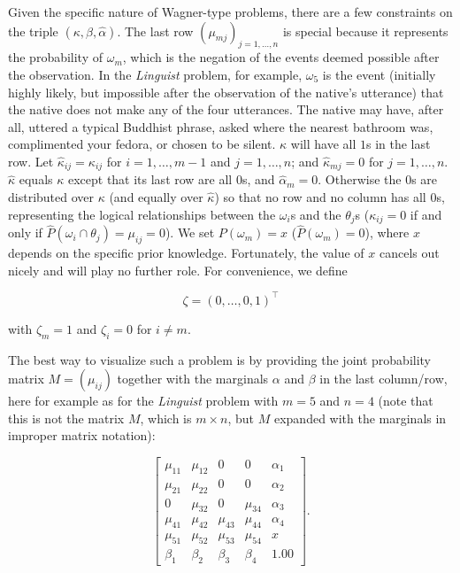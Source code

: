 \documentclass[phd,12pt,oneside]{ubcthesis}
\begin{document}
Given the specific nature of Wagner-type problems, there are a few
constraints on the triple $(\kappa,\beta,\hat{\alpha})$. The last row
$(\mu_{mj})_{j=1,\ldots,n}$ is special because it represents the
probability of $\omega_{m}$, which is the negation of the events
deemed possible after the observation. In the \emph{Linguist} problem,
for example, $\omega_{5}$ is the event (initially highly likely, but
impossible after the observation of the native's utterance) that the
native does not make any of the four utterances. The native may have,
after all, uttered a typical Buddhist phrase, asked where the nearest
bathroom was, complimented your fedora, or chosen to be silent.
$\kappa$ will have all $1$s in the last row. Let
$\hat{\kappa}_{ij}=\kappa_{ij}$ for $i=1,\ldots,m-1$ and
$j=1,\ldots,n$; and $\hat{\kappa}_{mj}=0$ for $j=1,\ldots,n$.
$\hat{\kappa}$ equals $\kappa$ except that its last row are all $0$s,
and $\hat{\alpha}_{m}=0$. Otherwise the $0$s are distributed over
$\kappa$ (and equally over $\hat{\kappa}$) so that no row and no
column has all $0$s, representing the logical relationships between
the $\omega_{i}$s and the $\theta_{j}$s ($\kappa_{ij}=0$ if and only
if $\hat{P}(\omega_{i}\cap\theta_{j})=\mu_{ij}=0$). We set
$P(\omega_{m})=x$ ($\hat{P}(\omega_{m})=0$), where $x$ depends on the
specific prior knowledge. Fortunately, the value of $x$ cancels out
nicely and will play no further role. For convenience, we define

\begin{equation}
\label{eq:zeta}
\zeta=(0,\ldots,0,1)^{\top}
\end{equation}

{\noindent}with $\zeta_{m}=1$ and $\zeta_{i}=0$ for $i\neq{}m$.

The best way to visualize such a problem is by providing the joint
probability matrix $M=(\mu_{ij})$ together with the marginals $\alpha$
and $\beta$ in the last column/row, here for example as for the
\emph{Linguist} problem with $m=5$ and $n=4$ (note that this is not
the matrix $M$, which is $m\times{}n$, but $M$ expanded with the
marginals in improper matrix notation):

\begin{equation}
  \label{eq:m3}
      \left[
      \begin{array}{ccccc}
        \mu_{11} & \mu_{12} & 0 & 0 & \alpha_{1} \\
        \mu_{21} & \mu_{22} & 0 & 0 & \alpha_{2} \\
        0 & \mu_{32} & 0 & \mu_{34} & \alpha_{3} \\
        \mu_{41} & \mu_{42} & \mu_{43} & \mu_{44} & \alpha_{4} \\
        \mu_{51} & \mu_{52} & \mu_{53} & \mu_{54} & x \\
        \beta_{1} & \beta_{2} & \beta_{3} & \beta_{4} & 1.00
      \end{array}
\right].
\end{equation}
\end{document}

